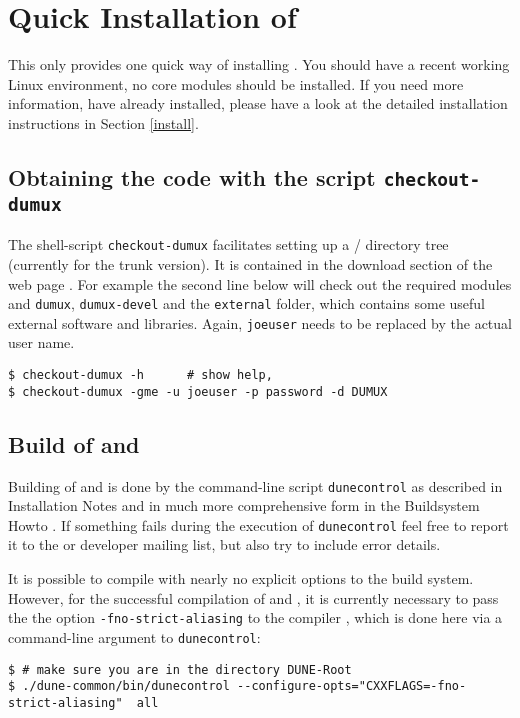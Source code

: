 \section{Quick Installation of \Dumux} \label{quick-install}

This only provides one quick way of installing \Dumux. 
You should have a recent working Linux environment, no \Dune core modules should be installed. 
If you need more information, 
have \Dune already installed, please have a look at the detailed installation 
instructions in Section \ref{install}. 

\subsection{Obtaining the code with the script \texttt{checkout-dumux}}

The shell-script \texttt{checkout-dumux} facilitates setting up a {\Dune}/{\Dumux} directory tree (currently for the trunk version).
It is contained in the download section of the \Dumux web page \cite{DUMUX-HP}.
For example the second line below will check out the required \Dune modules and \texttt{dumux}, 
\texttt{dumux-devel} and the \texttt{external} folder, which contains some useful external software and libraries.
Again,  \texttt{joeuser} needs to be replaced by the actual user name.
\begin{lstlisting}[style=Bash]
$ checkout-dumux -h      # show help,
$ checkout-dumux -gme -u joeuser -p password -d DUMUX 
\end{lstlisting}


\subsection{Build of \Dune and \Dumux}
\label{buildIt}
Building of \Dune and \Dumux is done by the command-line script \texttt{dunecontrol} as described in \Dune Installation Notes \cite{DUNE-INST}
and in much more comprehensive form in the \Dune Buildsystem Howto \cite{DUNE-BS}.
If something fails during the execution of \texttt{dunecontrol} feel free to report it to the \Dune or \Dumux developer mailing list,
but also try to include error details.

It is possible to compile \Dumux with nearly no explicit options to the build system.
However, for the successful compilation of \Dune and \Dumux, it is currently necessary to pass the
the option \texttt{-fno-strict-aliasing} to the \Cplusplus compiler
\cite{WIKIPED-ALIASING}, which is done here via a command-line argument to \texttt{dunecontrol}:
\begin{lstlisting}[style=Bash]
$ # make sure you are in the directory DUNE-Root
$ ./dune-common/bin/dunecontrol --configure-opts="CXXFLAGS=-fno-strict-aliasing"  all
\end{lstlisting}


